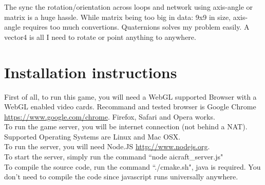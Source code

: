 \documentclass[12pt]{article}
\begin{document}
The sync the rotation/orientation across loops and network using axis-angle or matrix is a huge hassle. While matrix being too big in data: 9x9 in size, axis-angle requires too much convertions. Quaternions solves my problem easily. A vector4 is all I need to rotate or point anything to anywhere.\\

\section{Installation instructions}

First of all, to run this game, you will need a WebGL supported Browser with a WebGL enabled video cards. Recommand and tested browser is Google Chrome \url{https://www.google.com/chrome}. Firefox, Safari and Opera works.\\

To run the game server, you will be internet connection (not behind a NAT). Supported Operating Systems are Linux and Mac OSX.\\

To run the server, you will need Node.JS \url{http://www.nodejs.org}.\\

To start the server, simply run the command ``node aicraft\_server.js"\\

To compile the source code, run the command ``./cmake.sh", java is required. You don't need to compile the code since javascript runs universally anywhere.
\end{document}
